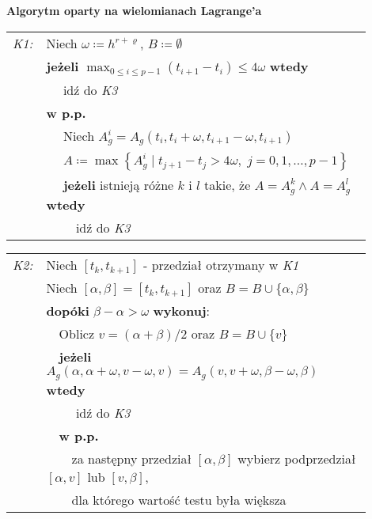 \documentclass[oik, pdftex, robocza, man]{mgrwms}
\begin{document}
    \vspace{10pt}
    \begin{table}[H]
        \begin{center}
            \textbf{Algorytm oparty na wielomianach Lagrange'a}            
        \end{center}

        \begin{tabular}{p{0.045\linewidth} p{0.85\linewidth}}
            \textit{K1:}    & Niech $\omega \coloneqq h^{r+\varrho}$, $B \coloneqq \emptyset$ \\
                            & \textbf{jeżeli} \(\displaystyle \max_{0 \leq i \leq p-1} (t_{i+1} - t_{i}) \leq 4\omega \) \textbf{wtedy} \\
                            & $\quad$ idź do \textit{K3} \\
                            & \textbf{w p.p.} \\
                            & $\quad$ Niech $A_{g}^{i} = A_{g}\left(t_{i}, t_{i}+\omega, t_{i+1}-\omega, t_{i+1}\right)$ \\
                            & $\quad$ $A\coloneqq\max \left\{A_{g}^{i} \mid t_{j+1}-t_{j}>4 \omega,\; j=0,1, \ldots, p-1 \right\}$ \\
                            & $\quad$ \textbf{jeżeli} istnieją różne $k$ i $l$ takie, że $A = A_{g}^{k} \land A = A_{g}^{l}$ \textbf{wtedy} \\
                            & $\quad\quad$ idź do \textit{K3} \\
        \end{tabular}
    \end{table} \vspace{-20pt}
    \begin{table}[H]
        \begin{tabular}{p{0.045\linewidth} p{0.85\linewidth}}
        \textit{K2:}    & Niech $[t_{k}, t_{k+1}]$ - przedział otrzymany w \textit{K1} \\
                        & Niech $[\alpha,\beta] = [t_{k}, t_{k+1}]$ oraz $B = B \cup \{\alpha, \beta\}$ \\
                        & \textbf{dopóki} $\beta - \alpha > \omega$ \textbf{wykonuj}: \\
                        & $\quad$Oblicz $v = (\alpha + \beta) / 2$ oraz $B = B \cup \{v\}$ \\
                        & $\quad$\textbf{jeżeli} $A_{g}(\alpha, \alpha + \omega, v - \omega, v) = A_{g}(v, v + \omega, \beta - \omega, \beta)$ \textbf{wtedy} \\
                        & $\quad$$\quad$ idź do \textit{K3} \\
                        & $\quad$\textbf{w p.p.} \\
                        & $\quad$$\quad$za następny przedział $[\alpha, \beta]$ wybierz podprzedział $[\alpha, v]$ lub $[v, \beta]$, \\
                        & $\quad$$\quad$dla którego wartość testu była większa \\
        \end{tabular}
    \end{table} \vspace{-20pt}
\end{document}
